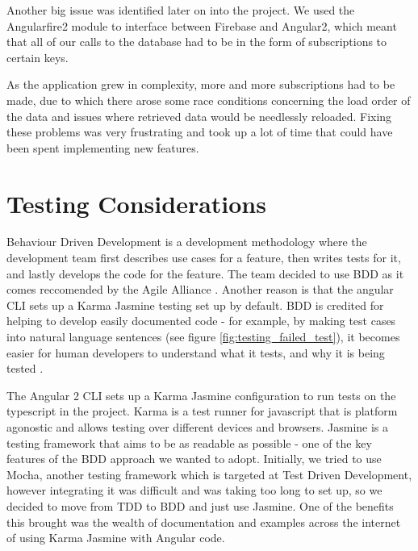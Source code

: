 \documentclass{l3proj}
\begin{document}
Another big issue was identified later on into the project. We used the
 Angularfire2 module to interface between Firebase and Angular2, which meant
 that all of our calls to the database had to be in the form of subscriptions
 to certain keys.

As the application grew in complexity, more and more subscriptions had to be
 made, due to which there arose some race conditions concerning the load order
 of the data and issues where retrieved data would be needlessly reloaded.
 Fixing these problems was very frustrating and took up a lot of time that
 could have been spent implementing new features.

\section{Testing Considerations}
\label{sec:testing}

Behaviour Driven Development is a development methodology where the development team
 first describes use cases for a feature, then writes tests for it, and lastly
 develops the code for the feature. The team decided to use BDD as it comes
 reccomended by the Agile Alliance \cite{agilealliance_bdd}. Another reason
 is that the angular CLI sets up a Karma Jasmine testing set up by default.
 BDD is credited for helping to develop easily documented code - for example,
 by making test cases into natural language sentences (see figure
 \ref{fig:testing_failed_test}), it becomes easier for human developers to
 understand what it tests, and why it is being tested \cite{north2006bdd}.

 

The Angular 2 CLI sets up a Karma Jasmine configuration to run tests on
 the typescript in the project. Karma is a test runner for javascript
 that is platform agonostic and allows testing over different devices
 and browsers. Jasmine is a testing framework that aims to be as readable
 as possible - one of the key features of the BDD approach we wanted to
 adopt. Initially, we tried to use Mocha, another testing framework which
 is targeted at Test Driven Development, however integrating it was difficult
 and was taking too long to set up, so we decided to move from TDD to BDD and
 just use Jasmine. One of the benefits this brought was the wealth of
 documentation and examples across the internet of using Karma Jasmine
 with Angular code.
\end{document}
